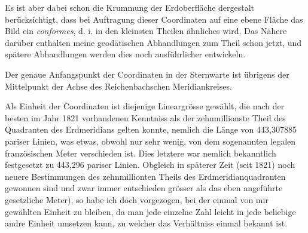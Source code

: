 Es ist aber dabei schon die Krummung der Erdoberfläche dergestalt berücksichtigt, dass bei Auftragung dieser Coordinaten auf eine ebene Fläche das Bild ein \textit{conformes}, d. i. in den kleinsten Theilen ähnliches wird. Das Nähere darüber enthalten meine geodätischen Abhandlungen zum Theil schon jetzt, und spätere Abhandlungen werden dies noch ausführlicher entwickeln.

Der genaue Anfangspunkt der Coordinaten in der Sternwarte ist übrigens der Mittelpunkt der Achse des Reichenbachschen Meridiankreises.

Als Einheit der Coordinaten ist diejenige Lineargrösse gewählt, die nach der besten im Jahr 1821 vorhandenen Kenntniss als der zehnmillionste Theil des Quadranten des Erdmeridians gelten konnte, nemlich die Länge von 443,307885 pariser Linien, was etwas, obwohl nur sehr wenig, von dem sogenannten legalen französischen Meter verschieden ist. Dies letztere war nemlich bekanntlich festgesetzt zu 443,296 pariser Linien. Obgleich in späterer Zeit (seit 1821) noch neuere Bestimmungen des zehnmillionten Theils des Erdmeridianquadranten gewonnen sind und zwar immer entschieden grösser als das eben angeführte gesetzliche Meter), so habe ich doch vorgezogen, bei der einmal von mir gewählten Einheit zu bleiben, da man jede einzelne Zahl leicht in jede beliebige andre Einheit umsetzen kann, zu welcher das Verhältniss einmal bekannt ist.
